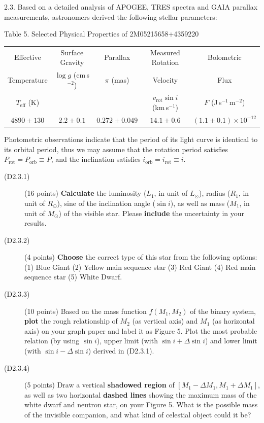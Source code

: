 2.3. Based on a detailed analysis of APOGEE, TRES spectra and GAIA parallax
measurements, astronomers derived the following stellar parameters:

\begin{center}
Table 5. Selected Physical Properties of 2M05215658+4359220

\medskip
\begin{tabular}{ccccc}
Effective & Surface Gravity & Parallax & Measured Rotation & Bolometric \\
Temperature & $\log g$ (cm\,s$^{-2}$) & $\pi$ (mas) & Velocity & Flux \\
$T_{\mathrm{eff}}$ (K) & & &
  $v_{\mathrm{rot}}\sin i$ (km\,s$^{-1}$) &
  $F$ (J\,s$^{-1}$\,m$^{-2}$) \\
$4890 \pm 130$ & $2.2 \pm 0.1$ & $0.272 \pm 0.049$ & $14.1 \pm 0.6$ &
  $(1.1 \pm 0.1) \times 10^{-12}$ \\
\end{tabular}
\end{center}

Photometric observations indicate that the period of its light curve is
identical to its orbital period, thus we may assume that the rotation period
satisfies $P_{\mathrm{rot}} = P_{\mathrm{orb}} \equiv P$, and the inclination
satisfies $i_{\mathrm{orb}} = i_{\mathrm{rot}} \equiv i$.

\begin{description}
\item[(D2.3.1)] (16 points) \textbf{Calculate} the luminosity ($L_1$, in
  unit of $L_\odot$), radius ($R_1$, in unit of $R_\odot$), sine of the
  inclination angle ($\sin i$), as well as mass ($M_1$, in unit of
  $M_\odot$) of the visible star. Please \textbf{include} the uncertainty in
  your results.
\item[(D2.3.2)] (4 points) \textbf{Choose} the correct type of this star
  from the following options: (1) Blue Giant (2) Yellow main sequence star
  (3) Red Giant (4) Red main sequence star (5) White Dwarf.
\item[(D2.3.3)] (10 points) Based on the mass function $f(M_1, M_2)$ of the
  binary system, \textbf{plot} the rough relationship of $M_2$ (as vertical
  axis) and $M_1$ (as horizontal axis) on your graph paper and label it as
  Figure 5. Plot the most probable relation (by using $\sin i$), upper limit
  (with $\sin i + \Delta\sin i$) and lower limit (with
  $\sin i - \Delta\sin i$) derived in (D2.3.1).
\item[(D2.3.4)] (5 points) Draw a vertical \textbf{shadowed region} of
  $[M_1 - \Delta M_1, M_1 + \Delta M_1]$, as well as two horizontal
  \textbf{dashed lines} showing the maximum mass of the white dwarf and
  neutron star, on your Figure 5. What is the possible mass of the invisible
  companion, and what kind of celestial object could it be?
\end{description}

